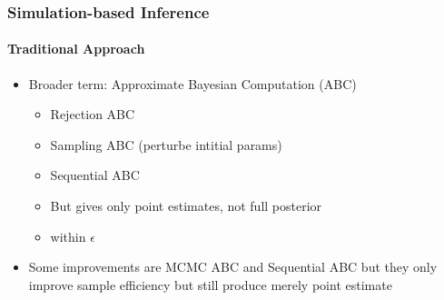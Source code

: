 \documentclass[9pt]{beamer}
\begin{document}
%



\begin{frame}
\frametitle{Simulation-based Inference}
\framesubtitle{Traditional Approach}
\begin{itemize}
	\item Broader term: Approximate Bayesian Computation (ABC)
	\begin{itemize}
		\item Rejection ABC
		\item Sampling ABC (perturbe intitial params)
		\item Sequential ABC
	\end{itemize}
	\begin{itemize}
		\item But gives only point estimates, not full posterior
		\item within $\epsilon$
	\end{itemize}
	\item Some improvements are MCMC ABC and Sequential ABC but they only improve sample efficiency but still produce merely point estimate	
\end{itemize}
\end{frame} 
\end{document}
